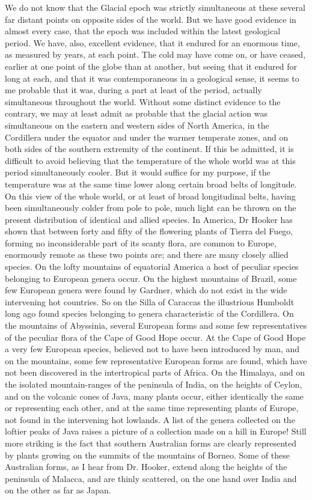 \indent We do not know that the Glacial epoch was strictly simultaneous at these several far distant points on opposite sides of the world. But we have good evidence in almost every case, that the epoch was included within the latest geological period. We have, also, excellent evidence, that it endured for an enormous time, as measured by years, at each point. The cold may have come on, or have ceased, earlier at one point of the globe than at another, but seeing that it endured for long at each, and that it was contemporaneous in a geological sense, it seems to me probable that it was, during a part at least of the period, actually simultaneous throughout the world.  Without some distinct evidence to the contrary, we may at least admit as probable that the glacial action was simultaneous on the eastern and western sides of North America, in the Cordillera under the equator and under the warmer temperate zones, and on both sides of the southern extremity of the continent. If this be admitted, it is difficult to avoid believing that the temperature of the whole world was at this period simultaneously cooler. But it would suffice for my purpose, if the temperature was at the same time lower along certain broad belts of longitude.~\\
\indent On this view of the whole world, or at least of broad longitudinal belts, having been simultaneously colder from pole to pole, much light can be thrown on the present distribution of identical and allied species. In America, Dr Hooker has shown that between forty and fifty of the flowering plants of Tierra del Fuego, forming no inconsiderable part of its scanty flora, are common to Europe, enormously remote as these two points are; and there are many closely allied species. On the lofty mountains of equatorial America a host of peculiar species belonging to European genera occur. On the highest mountains of Brazil, some few European genera were found by Gardner, which do not exist in the wide intervening hot countries. So on the Silla of Caraccas the illustrious Humboldt long ago found species belonging to genera characteristic of the Cordillera. On the mountains of Abyssinia, several European forms and some few representatives of the peculiar flora of the Cape of Good Hope occur. At the Cape of Good Hope a very few European species, believed not to have been introduced by man, and on the mountains, some few representative European forms are found, which have not been discovered in the intertropical parts of Africa. On the Himalaya, and on the isolated mountain-ranges of the peninsula of India, on the heights of Ceylon, and on the volcanic cones of Java, many plants occur, either identically the same or representing each other, and at the same time representing plants of Europe, not found in the intervening hot lowlands. A list of the genera collected on the loftier peaks of Java raises a picture of a collection made on a hill in Europe! Still more striking is the fact that southern Australian forms are clearly represented by plants growing on the summits of the mountains of Borneo. Some of these Australian forms, as I hear from Dr. Hooker, extend along the heights of the peninsula of Malacca, and are thinly scattered, on the one hand over India and on the other as far as Japan.~\\
